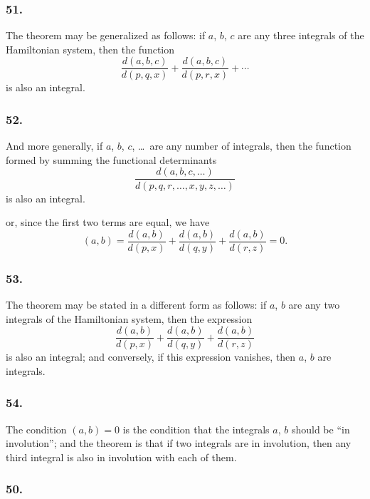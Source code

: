 \documentclass[12pt,a4paper]{article}
\theoremstyle{plain}
\begin{document}
\subsubsection*{51.}

The theorem may be generalized as follows: if $a$, $b$, $c$ are any three integrals of the Hamiltonian system, then the function
\[
\frac{d(a, b, c)}{d(p, q, x)} + \frac{d(a, b, c)}{d(p, r, x)} + \cdots
\]
is also an integral.

\subsubsection*{52.}

And more generally, if $a$, $b$, $c$, \ldots\ are any number of integrals, then the function formed by summing the functional determinants
\[
\frac{d(a, b, c, \ldots)}{d(p, q, r, \ldots, x, y, z, \ldots)}
\]
is also an integral.

\newpage
\setcounter{page}{134}

or, since the first two terms are equal, we have
\[
(a, b) = \frac{d(a, b)}{d(p, x)} + \frac{d(a, b)}{d(q, y)} + \frac{d(a, b)}{d(r, z)} = 0.
\]

\subsubsection*{53.}

The theorem may be stated in a different form as follows: if $a$, $b$ are any two integrals of the Hamiltonian system, then the expression
\[
\frac{d(a, b)}{d(p, x)} + \frac{d(a, b)}{d(q, y)} + \frac{d(a, b)}{d(r, z)}
\]
is also an integral; and conversely, if this expression vanishes, then $a$, $b$ are integrals.

\subsubsection*{54.}

The condition $(a, b) = 0$ is the condition that the integrals $a$, $b$ should be ``in involution''; and the theorem is that if two integrals are in involution, then any third integral is also in involution with each of them.

\newpage
\setcounter{page}{135}

\subsubsection*{50.}
\end{document}
